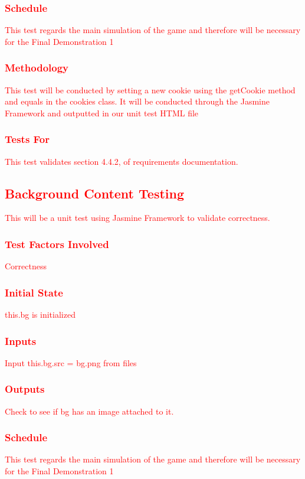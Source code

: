 \documentclass[11pt, oneside]{article}   	%
\begin{document}
\subsubsection{\textcolor{red}{Schedule}}
\textcolor{red}{This test regards the main simulation of the game and therefore will be necessary for the Final Demonstration 1}
\subsubsection{\textcolor{red}{Methodology}}
\textcolor{red}{This test will be conducted by setting a new cookie using the getCookie method and equals in the cookies class. It will be conducted through the Jasmine Framework and outputted in our unit test HTML file}
\subsubsection{\textcolor{red}{Tests For}}
\textcolor{red}{This test validates section 4.4.2, of requirements documentation.}



\subsection{\textcolor{red}{Background Content Testing}}
\textcolor{red}{This will be a unit test using Jasmine Framework to validate correctness.}
\subsubsection{\textcolor{red}{Test Factors Involved}}
\textcolor{red}{Correctness}
\subsubsection{\textcolor{red}{Initial State}}
\textcolor{red}{this.bg is initialized}
\subsubsection{\textcolor{red}{Inputs}}
\textcolor{red}{Input this.bg.src = bg.png from files}
\subsubsection{\textcolor{red}{Outputs}}
\textcolor{red}{Check to see if bg has an image attached to it.}
\subsubsection{\textcolor{red}{Schedule}}
\textcolor{red}{This test regards the main simulation of the game and therefore will be necessary for the Final Demonstration 1}
\end{document}
